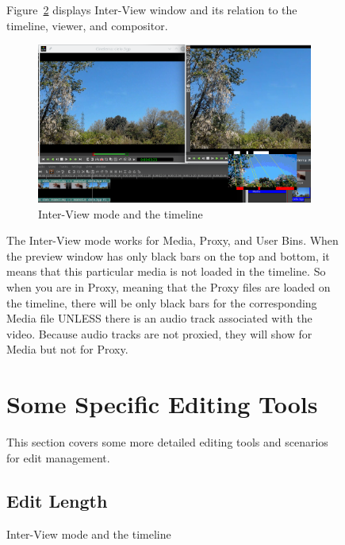 \begin{figure}
Figure~\ref{fig:inter-view02} displays Inter-View window and its relation to the timeline, viewer, and compositor.
\begin{figure}[htpb]
    \centering
    \includegraphics[width=0.9\linewidth]{images/inter-view02.png}
    \caption{Inter-View mode and the timeline}
    \label{fig:inter-view02}
\end{figure}
The Inter-View mode works for Media, Proxy, and User Bins.  When the preview window has only black bars on the top and bottom, it means that this particular media is not loaded in the timeline.  So when you are in Proxy, meaning that the Proxy files are loaded on the timeline, there will be only black bars for the corresponding Media file UNLESS there is an audio track associated with the video.  Because audio tracks are not proxied, they will show for Media but not for Proxy.

\section{Some Specific Editing Tools}%
\label{sec:specific_editing_tools}

This section covers some more detailed editing tools and scenarios for edit management.

\subsection{Edit Length}%
\label{sub:edit-lenght}


\end{figure}
